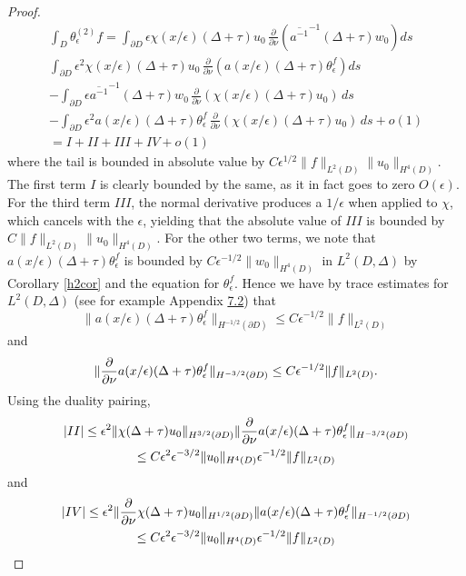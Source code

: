 \documentclass[10pt,a4paper]{amsart}
\begin{document}
\begin{proof}
\begin{multline}
\int_ D \theta_\epsilon^{(2)} f =  \int_{\partial  D}\epsilon\chi(x/\epsilon)(\Delta +\tau)u_0 \, \frac{\partial}{\partial\nu}\left(  \overline{a^{-1}}^{-1} (\Delta +\tau) w_0\right)ds\\ \int_{\partial  D}\epsilon^2\chi(x/\epsilon)(\Delta +\tau)u_0 \, \frac{\partial}{\partial\nu}\left(  a(x/\epsilon) (\Delta +\tau) \theta^f_\epsilon\right)ds \\ - \int_{\partial D} \epsilon  \overline{a^{-1}}^{-1}  (\Delta +\tau) w_0\,\frac{\partial}{\partial\nu} \left(\chi(x/\epsilon)(\Delta +\tau)u_0\right) \, ds \\- \int_{\partial D} \epsilon^2 a(x/\epsilon) (\Delta +\tau) \theta^f_\epsilon \,\frac{\partial}{\partial\nu} \left(\chi(x/\epsilon)(\Delta +\tau)u_0\right) \, ds +o(1) \\ = I+II +III +IV +o(1)
\end{multline}
where the tail is bounded in absolute value by $C\epsilon^{1/2}\| f \|_{L^2(D)} \| u_0\| _{H^4(D)}$. The first term $I$ is clearly bounded by the same, as it in fact goes to zero $O(\epsilon)$. For the third term $III$, the normal derivative produces a $1/\epsilon$ when applied to $\chi$, which cancels with the $\epsilon$, yielding that the absolute value of $III$ is bounded by $C\| f \|_{L^2(D)} \| u_0\| _{H^4(D)}$.  For the other two terms, we note that $ a(x/\epsilon) (\Delta +\tau) \theta^f_\epsilon $ is bounded by $ C\epsilon^{-1/2} \| w_0 \|_{H^4(D)}$ in $L^2(D,\Delta)$ by Corollary \ref{h2cor} and the equation for $\theta^f_\epsilon$.  Hence we have by trace estimates for $L^2(D,\Delta)$  (see for example Appendix \href{https://arxiv.org/abs/2508.21174v1}{7.2})  that $$ \| a(x/\epsilon) (\Delta +\tau) \theta^f_\epsilon \|_{H^{-1/2}(\partial D)} \leq C\epsilon^{-1/2} \| f \|_{L^2(D)} $$ and
$$ \| {\partial\over{\partial\nu}} a(x/\epsilon) (\Delta +\tau) \theta^f_\epsilon \|_{H^{-3/2}(\partial D)} \leq C\epsilon^{-1/2} \| f \|_{L^2(D)}. $$
Using the duality pairing, 
\begin{multline} | II | \leq  \epsilon^2 \| \chi(\Delta +\tau)u_0 \|_{H^{3/2}(\partial D)}  \| {\partial\over{\partial\nu}} a(x/\epsilon) (\Delta +\tau) \theta^f_\epsilon \|_{H^{-3/2}(\partial D)} \\ \leq  C\epsilon^2 \epsilon^{-3/2} \| u_0\|_{H^4(D)} \epsilon^{-1/2} \| f \|_{L^2(D)} \end{multline} 
and \begin{multline}  | IV | \leq  \epsilon^2 \| {\partial\over{\partial\nu}} \chi(\Delta +\tau)u_0 \|_{H^{1/2}(\partial D)}  \| a(x/\epsilon) (\Delta +\tau) \theta^f_\epsilon \|_{H^{-1/2}(\partial D)} \\ \leq  C\epsilon^2 \epsilon^{-3/2} \| u_0\|_{H^4(D)} \epsilon^{-1/2} \| f \|_{L^2(D)} \end{multline} 

\end{proof}
\end{document}
